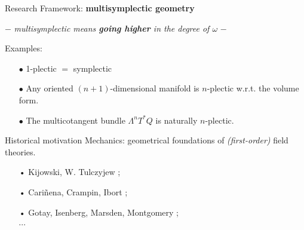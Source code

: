 \documentclass[10pt]{beamer}
\begin{document}
\begin{frame}[t, fragile]{Research Framework:  \textbf{multisymplectic geometry}} %
	\begin{center}
		$-$ \emph{multisymplectic means \textbf{going higher} in the degree of $\omega$} $-$
	\end{center}
	\pause
	\begin{defblock}
			
	\end{defblock}
	\vfill
	\pause
	\begin{block}{Examples:}
		\begin{itemize}
			\item[$\bullet$] 1-plectic $=$ symplectic
			\item[$\bullet$] Any oriented $(n+1)$-dimensional manifold is $n$-plectic w.r.t. the volume form.
			\item[$\bullet$] The multicotangent bundle $\Lambda^n T^\ast Q$ is naturally $n$-plectic.
		\end{itemize}
	\end{block}			 
%
	\pause
	\begin{block}{Historical motivation}
		Mechanics: geometrical foundations of \textit{(first-order)} field theories.
		\begin{itemize}
		 \item[•] Kijowski, W. Tulczyjew \cite{Kijowski1979}; %
		 \item[•] Cariñena, Crampin, Ibort \cite{Carinena1991b};%
		 \item[•] Gotay, Isenberg, Marsden, Montgomery \cite{Gimmsy1};%
		 \\ $\cdots$
		\end{itemize}
	\end{block}
\end{frame}
\end{document}
